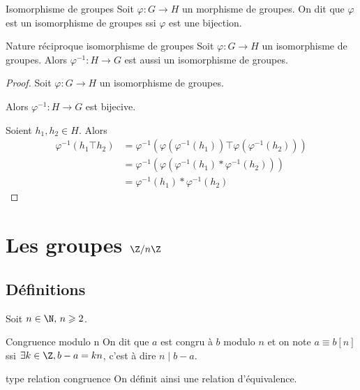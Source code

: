 \begin{definition}{Isomorphisme de groupes}{}
    Soit $\varphi : G \to H$ un morphisme de groupes. On dit que $\varphi$ est un isomorphisme 
    de groupes ssi $\varphi$ est une bijection. 
\end{definition}

\begin{theoreme}{Nature réciproque isomorphisme de groupes}{}
    Soit $\varphi : G \to H$ un isomorphisme de groupes. Alors $\varphi^{-1} : H \to G$ est aussi un isomorphisme de
    groupes.
\end{theoreme}


\begin{proof}
    Soit $\varphi : G \to H$ un isomorphisme de groupes. 

    Alors $\varphi^{-1} : H \to G$ est bijecive. 

    Soient $h_1, h_2 \in H$. Alors 
    \begin{align*}
        \varphi^{-1}(h_1 \top h_2) & = \varphi^{-1}(\varphi(\varphi^{-1}(h_1)) \top \varphi(\varphi^{-1}(h_2)))\\
        & = \varphi^{-1}(\varphi(\varphi^{-1}(h_1) \ast \varphi^{-1}(h_2))) \\
        & = \varphi^{-1}(h_1) \ast \varphi^{-1}(h_2)
    \end{align*}
\end{proof}


\section{Les groupes \texorpdfstring{$\Z / n \Z$}{Z/nZ}}
\subsection{Définitions }

Soit $n \in \N, \, n \geqslant 2$.

\begin{definition}{Congruence modulo n}{}
    On dit que $a$ est congru à $b$ modulo $n$ et on note $a \equiv b [n]$ ssi
    $\exists k \in \Z, b - a = kn$, c'est à dire $n \mid b - a$.    
\end{definition}

\begin{propositionnt}{type relation congruence}{}
    On définit ainsi une relation d'équivalence.
\end{propositionnt}


